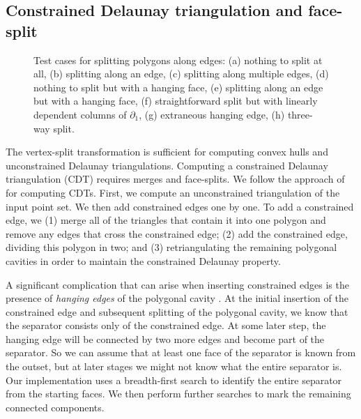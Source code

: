 \documentclass[twocolumn,leqno,twocolumn]{article}
\begin{document}
\subsection{Constrained Delaunay triangulation and face-split}

\begin{figure}[t]
    \begin{center}
        
    \end{center}
    \caption{Test cases for splitting polygons along edges: (a) nothing to split at all, (b) splitting along an edge, (c) splitting along multiple edges, (d) nothing to split but with a hanging face, (e) splitting along an edge but with a hanging face, (f) straightforward split but with linearly dependent columns of $\partial_1$, (g) extraneous hanging edge, (h) three-way split.}
    \label{fig:face-split-tests}
\end{figure}

The vertex-split transformation is sufficient for computing convex hulls and unconstrained Delaunay triangulations.
Computing a constrained Delaunay triangulation (CDT) requires merges and face-splits.
We follow the approach of \cite{anglada1997improved} for computing CDTs.
First, we compute an unconstrained triangulation of the input point set.
We then add constrained edges one by one.
To add a constrained edge, we (1) merge all of the triangles that contain it into one polygon and remove any edges that cross the constrained edge; (2) add the constrained edge, dividing this polygon in two; and (3) retriangulating the remaining polygonal cavities in order to maintain the constrained Delaunay property.

A significant complication that can arise when inserting constrained edges is the presence of \emph{hanging edges} of the polygonal cavity \cite{cheng2013delaunay}.
At the initial insertion of the constrained edge and subsequent splitting of the polygonal cavity, we know that the separator consists only of the constrained edge.
At some later step, the hanging edge will be connected by two more edges and become part of the separator.
So we can assume that at least one face of the separator is known from the outset, but at later stages we might not know what the entire separator is.
Our implementation uses a breadth-first search to identify the entire separator from the starting faces.
We then perform further searches to mark the remaining connected components.
\end{document}
